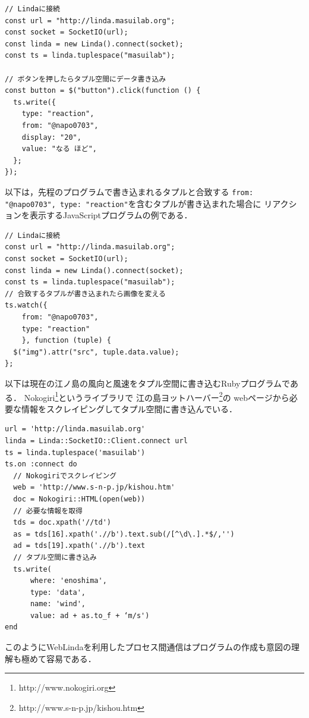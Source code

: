 \vspace{4mm}
\begin{lstlisting}
// Lindaに接続
const url = "http://linda.masuilab.org";
const socket = SocketIO(url);
const linda = new Linda().connect(socket);
const ts = linda.tuplespace("masuilab");

// ボタンを押したらタプル空間にデータ書き込み
const button = $("button").click(function () {
  ts.write({
    type: "reaction",
    from: "@napo0703",
    display: "20",
    value: "なる ほど",
  };
});
\end{lstlisting}
以下は，先程のプログラムで書き込まれるタプルと合致する
\texttt{{from: "@napo0703", type: "reaction"}}を含むタプルが書き込まれた場合に
リアクションを表示するJavaScriptプログラムの例である．
\vspace{4mm}
\begin{lstlisting}
// Lindaに接続
const url = "http://linda.masuilab.org";
const socket = SocketIO(url);
const linda = new Linda().connect(socket);
const ts = linda.tuplespace("masuilab");
// 合致するタプルが書き込まれたら画像を変える
ts.watch({
    from: "@napo0703",
    type: "reaction"
    }, function (tuple) {
  $("img").attr("src", tuple.data.value);
};
\end{lstlisting}
\vspace{4mm}
以下は現在の江ノ島の風向と風速をタプル空間に書き込むRubyプログラムである．
Nokogiri\footnote{http://www.nokogiri.org}というライブラリで
江の島ヨットハーバー\footnote{http://www.s-n-p.jp/kishou.htm}の
webページから必要な情報をスクレイピングしてタプル空間に書き込んでいる．
\vspace{4mm}
\begin{lstlisting}
url = 'http://linda.masuilab.org'
linda = Linda::SocketIO::Client.connect url
ts = linda.tuplespace('masuilab')
ts.on :connect do
  // Nokogiriでスクレイピング
  web = 'http://www.s-n-p.jp/kishou.htm'
  doc = Nokogiri::HTML(open(web))
  // 必要な情報を取得
  tds = doc.xpath('//td')
  as = tds[16].xpath('.//b').text.sub(/[^\d\.].*$/,'')
  ad = tds[19].xpath('.//b').text
  // タプル空間に書き込み
  ts.write(
      where: 'enoshima',
      type: 'data',
      name: 'wind',
      value: ad + as.to_f + ‘m/s')
end
\end{lstlisting}

このようにWebLindaを利用したプロセス間通信はプログラムの作成も意図の理解も極めて容易である．